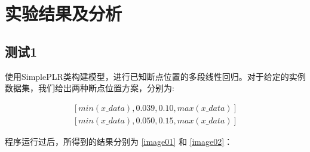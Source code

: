 
\section{实验结果及分析}
\subsection{测试1}

使用SimplePLR类构建模型，进行已知断点位置的多段线性回归。对于给定的实例数据集，我们给出两种断点位置方案，分别为:

\[\begin{aligned}
    [min(x\_data), 0.039, 0.10, max(x\_data)]
    \\
    [min(x\_data), 0.050, 0.15, max(x\_data)]
    \end{aligned}\]

程序运行过后，所得到的结果分别为 \ref{image01} 和 \ref{image02}：

